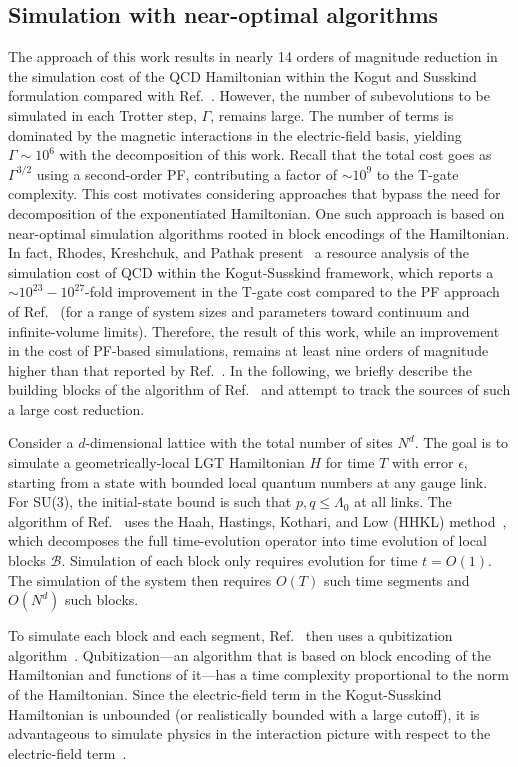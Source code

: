 \documentclass[aps,prd,twocolumn,showpacs,groupedaddress,superscriptaddress,nofootinbib,floatfix,preprintnumbers,longbibliography]{revtex4-1}
\begin{document}
\subsection{Simulation with near-optimal algorithms}
The approach of this work results in nearly 14 orders of magnitude reduction in the simulation cost of the QCD Hamiltonian within the Kogut and Susskind formulation compared with Ref.~\cite{Kan:2021xfc}. However, the number of subevolutions to be simulated in each Trotter step, $\Gamma$, remains large. The number of terms is dominated by the magnetic interactions in the electric-field basis, yielding $\Gamma \sim 10^6$ with the decomposition of this work. Recall that the total cost goes as $\Gamma^{3/2}$ using a second-order PF, contributing a factor of $\sim 10^9$ to the T-gate complexity. This cost motivates considering approaches that bypass the need for decomposition of the exponentiated Hamiltonian. One such approach is based on near-optimal simulation algorithms rooted in block encodings of the Hamiltonian. In fact, Rhodes, Kreshchuk, and Pathak present~\cite{Rhodes:2024zbr} a resource analysis of the simulation cost of QCD within the Kogut-Susskind framework, which reports a $\sim 10^{23} - 10^{27}$-fold improvement in the T-gate cost compared to the PF approach of Ref.~\cite{Kan:2021xfc} (for a range of system sizes and parameters toward continuum and infinite-volume limits). Therefore, the result of this work, while an improvement in the cost of PF-based simulations, remains at least nine orders of magnitude higher than that reported by Ref.~\cite{Rhodes:2024zbr}. In the following, we briefly describe the building blocks of the algorithm of Ref.~\cite{Rhodes:2024zbr} and attempt to track the sources of such a large cost reduction.

Consider a $d$-dimensional lattice with the total number of sites $N^d$. The goal is to simulate a geometrically-local LGT Hamiltonian $H$ for time $T$ with error $\epsilon$, starting from a state with bounded local quantum numbers at any gauge link. For SU(3), the initial-state bound is such that $p,q \leq \Lambda_0$ at all links. The algorithm of Ref.~\cite{Rhodes:2024zbr} uses the Haah, Hastings, Kothari, and Low (HHKL) method~\cite{Haah:2018ekc}, which decomposes the full time-evolution operator into time evolution of local blocks $\mathcal{B}$. Simulation of each block only requires evolution for time $t = O(1)$. The simulation of the system then requires $O(T)$ such time segments and $O(N^d)$ such blocks.

To simulate each block and each segment, Ref.~\cite{Rhodes:2024zbr} then uses a qubitization algorithm~\cite{Low:2016znh}. Qubitization---an algorithm that is based on block encoding of the Hamiltonian and functions of it---has a time complexity proportional to the norm of the Hamiltonian. Since the electric-field term in the Kogut-Susskind Hamiltonian is unbounded (or realistically bounded with a large cutoff), it is advantageous to simulate physics in the interaction picture with respect to the electric-field term~\cite{Rajput:2021khs,Tong:2021rfv}. 
\end{document}
